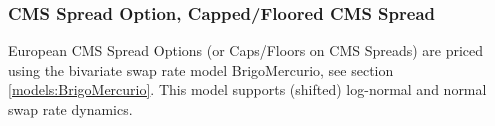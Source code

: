 \subsubsection{CMS Spread Option, Capped/Floored CMS Spread}
\label{pricing:ir_cmsspreadoption}

European CMS Spread Options (or Caps/Floors on CMS Spreads) are priced using the bivariate swap rate model
BrigoMercurio, see section \ref{models:BrigoMercurio}. This model supports (shifted) log-normal and normal swap rate
dynamics.

